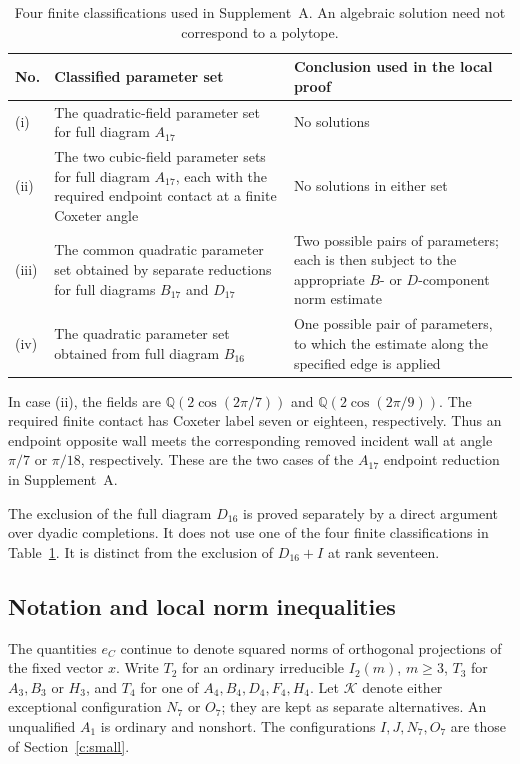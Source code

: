 \documentclass[11pt]{article}
\theoremstyle{definition}
\theoremstyle{remark}
\numberwithin{equation}{section}
\newcommand{\Q}{\mathbb Q}
\begin{document}
\begin{table}[htbp]
\centering
\caption{Four finite classifications used in Supplement~A.
An algebraic solution need not correspond to a polytope.}
\label{a:computed-inputs}
\begin{tabular}{>{\raggedright\arraybackslash}p{.08\linewidth}
 >{\raggedright\arraybackslash}p{.43\linewidth}
 >{\raggedright\arraybackslash}p{.39\linewidth}}
\toprule
No.&Classified parameter set&Conclusion used in the local proof\\\midrule
(i)&The quadratic-field parameter set for full diagram $A_{17}$&
 No solutions\\
(ii)&The two cubic-field parameter sets for full diagram $A_{17}$,
 each with the required endpoint contact at a finite Coxeter angle&
 No solutions in either set\\
(iii)&The common quadratic parameter set obtained by separate
 reductions for full diagrams $B_{17}$ and $D_{17}$&Two possible
 pairs of parameters; each is then subject to the appropriate
 $B$- or $D$-component norm estimate\\
(iv)&The quadratic parameter set obtained from full diagram $B_{16}$&
 One possible pair of parameters, to which the estimate along the
 specified edge is applied\\\bottomrule
\end{tabular}
\end{table}

In case (ii), the fields are $\Q(2\cos(2\pi/7))$ and
$\Q(2\cos(2\pi/9))$. The required finite contact has Coxeter
label seven or eighteen, respectively. Thus an endpoint opposite
wall meets the corresponding removed incident wall at angle
$\pi/7$ or $\pi/18$, respectively. These
are the two cases of the $A_{17}$ endpoint reduction in Supplement~A.

The exclusion of the full diagram $D_{16}$ is proved separately by
a direct argument over dyadic completions. It does not use one of
the four finite classifications in Table~\ref{a:computed-inputs}.
It is distinct from the exclusion of $D_{16}+I$ at rank seventeen.

\subsection{Notation and local norm inequalities}
\label{a:costs}

The quantities $e_C$ continue to denote squared norms of orthogonal
projections of the fixed vector $x$. Write $T_2$ for an ordinary
irreducible $I_2(m)$, $m\ge3$, $T_3$ for $A_3,B_3$ or $H_3$,
and $T_4$ for one of $A_4,B_4,D_4,F_4,H_4$.
Let $\mathcal K$ denote either exceptional configuration $N_7$ or
$O_7$; they are kept as separate alternatives. An unqualified $A_1$
is ordinary and nonshort. The configurations $I,J,N_7,O_7$ are those
of Section~\ref{c:small}.
\end{document}
